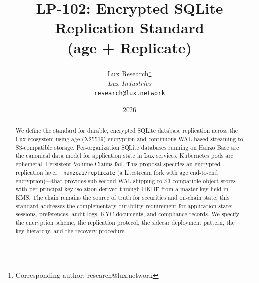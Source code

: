 \documentclass[11pt,a4paper]{article}
\title{LP-102: Encrypted SQLite Replication Standard\\(age + Replicate)}
\author{
Lux Research\thanks{Corresponding author: research@lux.network}\\
\textit{Lux Industries}\\
\texttt{research@lux.network}
}
\date{2026}
\begin{document}
\luxcoverpage

\begin{abstract}
We define the standard for durable, encrypted SQLite database replication
across the Lux ecosystem using age (X25519) encryption and continuous
WAL-based streaming to S3-compatible storage. Per-organization SQLite
databases running on Hanzo Base are the canonical data model for
application state in Lux services. Kubernetes pods are ephemeral.
Persistent Volume Claims fail. This proposal specifies an encrypted
replication layer---\texttt{hanzoai/replicate} (a Litestream fork with
age end-to-end encryption)---that provides sub-second WAL shipping to
S3-compatible object stores with per-principal key isolation derived
through HKDF from a master key held in KMS. The chain remains the source
of truth for securities and on-chain state; this standard addresses the
complementary durability requirement for application state: sessions,
preferences, audit logs, KYC documents, and compliance records. We
specify the encryption scheme, the replication protocol, the sidecar
deployment pattern, the key hierarchy, and the recovery procedure.
\end{abstract}

\tableofcontents
\newpage












\end{document}
